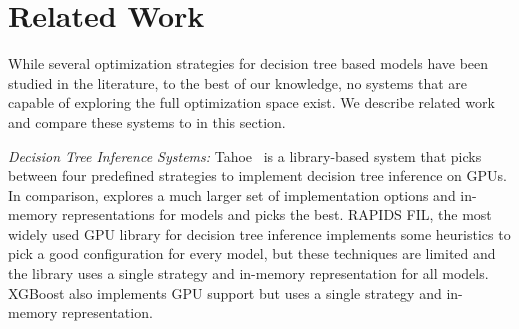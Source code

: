 \section{Related Work}
\label{Sec:Related}
While several optimization strategies for decision tree based models have been 
studied in the literature, to the best of our knowledge, no systems that are 
capable of exploring the full optimization space exist. We describe related work 
and compare these systems to \Treebeard{} in this section.

\emph{Decision Tree Inference Systems:} 
Tahoe~\cite{Tahoe} is a library-based system that picks 
between four predefined strategies to implement decision tree inference on GPUs.
In comparison, \Treebeard{} explores a much larger set of implementation options and 
in-memory representations for models and picks the best.
RAPIDS FIL\cite{FIL}, the most widely used GPU library for decision tree inference
implements some heuristics to pick a good configuration for every model, 
but these techniques are limited and the library uses a single strategy 
and in-memory representation for all models. XGBoost \cite{XGBoost} also implements GPU 
support\cite{XGBGPU} but uses a single strategy and in-memory representation. 

